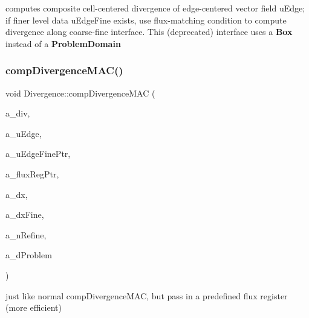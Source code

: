 computes composite cell-\/centered divergence of edge-\/centered vector field u\+Edge; if finer level data u\+Edge\+Fine exists, use flux-\/matching condition to compute divergence along coarse-\/fine interface. This (deprecated) interface uses a \textbf{ Box} instead of a \textbf{ Problem\+Domain} \mbox{\label{class_divergence_a7ea9ccc4a12abac5f0141e67c69f9c0f}} 
\subsubsection{\texorpdfstring{comp\+Divergence\+M\+A\+C()}{compDivergenceMAC()}\hspace{0.1cm}{\footnotesize\ttfamily [3/4]}}
{\footnotesize\ttfamily void Divergence\+::comp\+Divergence\+M\+AC (\begin{DoxyParamCaption}\item[{\textbf{ Level\+Data}$<$ \textbf{ F\+Array\+Box} $>$ \&}]{a\+\_\+div,  }\item[{\textbf{ Level\+Data}$<$ \textbf{ Flux\+Box} $>$ \&}]{a\+\_\+u\+Edge,  }\item[{\textbf{ Level\+Data}$<$ \textbf{ Flux\+Box} $>$ $\ast$}]{a\+\_\+u\+Edge\+Fine\+Ptr,  }\item[{\textbf{ Level\+Flux\+Register} $\ast$}]{a\+\_\+flux\+Reg\+Ptr,  }\item[{const \textbf{ Real}}]{a\+\_\+dx,  }\item[{const \textbf{ Real} $\ast$}]{a\+\_\+dx\+Fine,  }\item[{const int}]{a\+\_\+n\+Refine,  }\item[{const \textbf{ Problem\+Domain} \&}]{a\+\_\+d\+Problem }\end{DoxyParamCaption})\hspace{0.3cm}{\ttfamily [static]}}

just like normal comp\+Divergence\+M\+AC, but pass in a predefined flux register (more efficient) \mbox{\label{class_divergence_a6edc8c244f67ac7fcaf54386a1fed40b}} 
